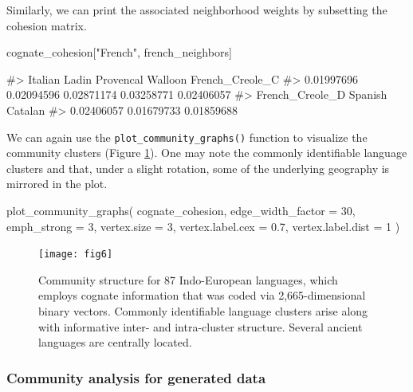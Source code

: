 Similarly, we can print the associated neighborhood weights by
subsetting the cohesion matrix.

\begin{Schunk}
\begin{Sinput}
cognate_cohesion["French", french_neighbors]
\end{Sinput}
\begin{Soutput}
#>         Italian           Ladin       Provencal         Walloon French_Creole_C 
#>      0.01997696      0.02094596      0.02871174      0.03258771      0.02406057 
#> French_Creole_D         Spanish         Catalan 
#>      0.02406057      0.01679733      0.01859688
\end{Soutput}
\end{Schunk}

We can again use the \texttt{plot\_community\_graphs()} function to
visualize the community clusters (Figure \ref{fig:figlang}). One may
note the commonly identifiable language clusters and that, under a
slight rotation, some of the underlying geography is mirrored in the
plot.

\begin{Schunk}
\begin{Sinput}
plot_community_graphs(
  cognate_cohesion,
  edge_width_factor = 30,
  emph_strong = 3,
  vertex.size = 3,
  vertex.label.cex = 0.7,
  vertex.label.dist = 1
)
\end{Sinput}
\end{Schunk}

\begin{Schunk}
\begin{figure}
\texttt{[image: fig6]} \caption[Community structure for 87 Indo-European languages, which employs cognate information that was coded via 2,665-dimensional binary vectors]{Community structure for 87 Indo-European languages, which employs cognate information that was coded via 2,665-dimensional binary vectors. Commonly identifiable language clusters arise along with informative inter- and intra-cluster structure. Several ancient languages are centrally located.}\label{fig:figlang}
\end{figure}
\end{Schunk}

\hypertarget{community-analysis-for-generated-data}{%
\subsubsection{Community analysis for generated
data}\label{community-analysis-for-generated-data}}


